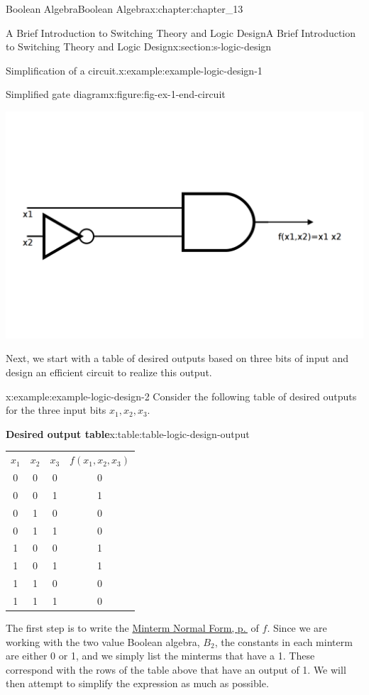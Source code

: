 \documentclass[twoside,10pt,]{book}
\newcommand{\tabularfont}{\relax}
\numberwithin{equation}{section}
\begin{document}
\begin{chapterptx}{Boolean Algebra}{}{Boolean Algebra}{}{}{x:chapter:chapter_13}
\begin{sectionptx}{A Brief Introduction to Switching Theory and Logic Design}{}{A Brief Introduction to Switching Theory and Logic Design}{}{}{x:section:s-logic-design}
\begin{example}{Simplification of a circuit.}{x:example:example-logic-design-1}
\begin{figureptx}{Simplified gate diagram}{x:figure:fig-ex-1-end-circuit}{}%
\begin{image}{0.2}{0.6}{0.2}%
\includegraphics[width=\linewidth]{images/fig-ex-1-end-circuit.png}
\end{image}%
\tcblower
\end{figureptx}%
\end{example}
Next, we start with a table of desired outputs based on three bits of input and design an efficient circuit to realize this output.%
\begin{example}{}{x:example:example-logic-design-2}%
Consider the following table of desired outputs for the three input bits \(x_1, x_2, x_3\).%
\begin{tableptx}{\textbf{Desired output table}}{x:table:table-logic-design-output}{}%
\centering
{\tabularfont%
\begin{tabular}{cccc}
\(x_1\)&\(x_2\)&\(x_3\)&\(f(x_1,x_2,x_3)\)\tabularnewline[0pt]
0&0&0&0\tabularnewline[0pt]
0&0&1&1\tabularnewline[0pt]
0&1&0&0\tabularnewline[0pt]
0&1&1&0\tabularnewline[0pt]
1&0&0&1\tabularnewline[0pt]
1&0&1&1\tabularnewline[0pt]
1&1&0&0\tabularnewline[0pt]
1&1&1&0
\end{tabular}
}%
\end{tableptx}%
The first step is to write the \hyperref[x:definition:def-minterm-normal-form]{Minterm Normal Form, p.\,\pageref{x:definition:def-minterm-normal-form}} of \(f\).  Since we are working with the two value Boolean algebra, \(B_2\), the constants in each minterm are either 0 or 1, and we simply list the minterms that have a 1. These correspond with the rows of the table above that have an output of 1.  We will then attempt to simplify the expression as much as possible.%

\end{example}
\end{sectionptx}
\end{chapterptx}
\end{document}
